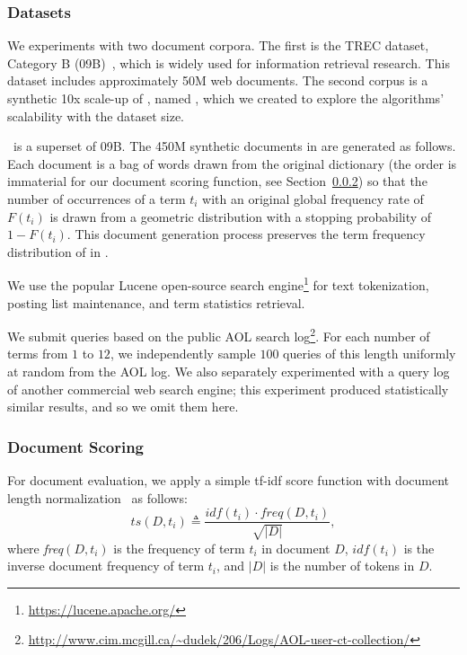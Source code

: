 \subsubsection{Datasets}
We  experiments with two document corpora. The first  is the TREC {\cw\/} dataset, 
Category B ({\cw}09B)~\cite{ClueWeb09}, which is widely used for information retrieval research. This dataset includes approximately 50M web documents. 
The second corpus is a synthetic 10x scale-up of \cw, named \cwten, which we created to explore the algorithms' scalability 
with the dataset size. 

\cwten\ is a superset of {\cw}09B.
The 450M synthetic documents in {\cwten\/} are generated as follows. Each document is a bag of words drawn from the original {\cw\/} dictionary 
(the order is immaterial for our document scoring function, see Section~\ref{ssec:scoring}) so that the number of occurrences of a term $t_i$ with an original 
global frequency rate of $F(t_i)$ is drawn from a geometric distribution with a stopping probability of $1-F(t_i)$. This document generation process preserves 
the  term frequency distribution of {\cw\/} in \cwten.
 
We use the popular Lucene open-source search engine\footnote{\small{\url{https://lucene.apache.org/}}} for text tokenization, posting list maintenance, 
and term statistics retrieval.

We submit queries based on the public AOL search log\footnote{\small{\url{http://www.cim.mcgill.ca/~dudek/206/Logs/AOL-user-ct-collection/}}}.
For each number of terms from $1$ to $12$, we independently sample $100$ queries of this length uniformly at random from the AOL log.
We also separately experimented with a query log of another commercial web search engine; this experiment  
produced statistically similar results, and so we omit them here.  

\subsubsection{Document Scoring}
\label{ssec:scoring}
For document evaluation, we apply a simple tf-idf score function with document length normalization~\cite{Baeza-Yates:1999:MIR:553876} as follows:
\[ \textit{ts}(D, t_i) \triangleq \frac{\textit{idf}(t_i) \cdot \textit{freq}(D, t_i)}{\sqrt{|D|}},\]
where \textit{freq}$(D, t_i)$ is the frequency of term $t_i$ in document $D$,
$\textit{idf}(t_i)$ is  the inverse document frequency of term $t_i$,
and $|D|$ is the number of tokens in $D$. 

